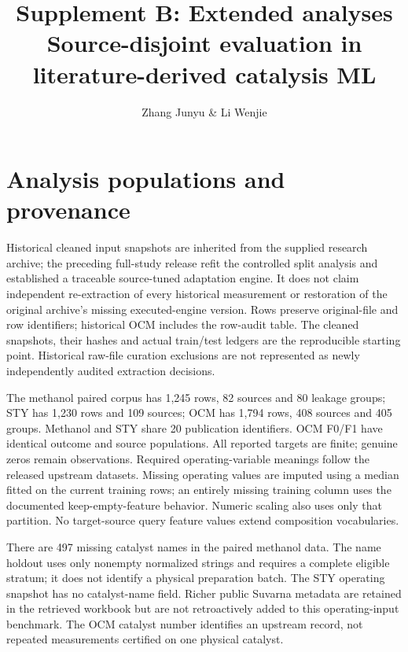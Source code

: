 \documentclass[11pt]{article}
\title{Supplement B: Extended analyses\\Source-disjoint evaluation in literature-derived catalysis ML}
\author{Zhang Junyu \& Li Wenjie}\date{}
\begin{document}
\renewcommand{\thepage}{B\arabic{page}}\renewcommand{\thetable}{B\arabic{table}}\renewcommand{\thefigure}{B\arabic{figure}}\renewcommand{\theequation}{B\arabic{equation}}\maketitle
\section{Analysis populations and provenance}
Historical cleaned input snapshots are inherited from the supplied research archive; the preceding full-study release refit the controlled split analysis and established a traceable source-tuned adaptation engine. It does not claim independent re-extraction of every historical measurement or restoration of the original archive's missing executed-engine version. Rows preserve original-file and row identifiers; historical OCM includes the row-audit table. The cleaned snapshots, their hashes and actual train/test ledgers are the reproducible starting point. Historical raw-file curation exclusions are not represented as newly independently audited extraction decisions.

The methanol paired corpus has 1,245 rows, 82 sources and 80 leakage groups; STY has 1,230 rows and 109 sources; OCM has 1,794 rows, 408 sources and 405 groups. Methanol and STY share 20 publication identifiers. OCM F0/F1 have identical outcome and source populations. All reported targets are finite; genuine zeros remain observations. Required operating-variable meanings follow the released upstream datasets. Missing operating values are imputed using a median fitted on the current training rows; an entirely missing training column uses the documented keep-empty-feature behavior. Numeric scaling also uses only that partition. No target-source query feature values extend composition vocabularies.

There are 497 missing catalyst names in the paired methanol data. The name holdout uses only nonempty normalized strings and requires a complete eligible stratum; it does not identify a physical preparation batch. The STY operating snapshot has no catalyst-name field. Richer public Suvarna metadata are retained in the retrieved workbook but are not retroactively added to this operating-input benchmark. The OCM catalyst number identifies an upstream record, not repeated measurements certified on one physical catalyst.
\end{document}
